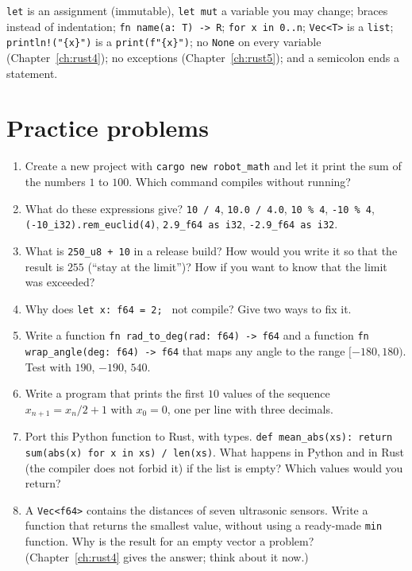 \begin{aibox}
\verb!let! is an assignment (immutable), \verb!let mut! a variable you may change; braces instead of indentation; \verb!fn name(a: T) -> R!; \verb!for x in 0..n!; \verb!Vec<T>! is a \verb!list!; \verb|println!("{x}")| is a \verb!print(f"{x}")!; no \verb!None! on every variable (Chapter~\ref{ch:rust4}); no exceptions (Chapter~\ref{ch:rust5}); and a semicolon ends a statement.
\end{aibox}

\section*{Practice problems}
\begin{enumerate}[label=\textbf{\thechapter.\arabic*}]
  \item Create a new project with \verb!cargo new robot_math! and let it print the sum of the numbers $1$ to $100$. Which command compiles without running?
  \item What do these expressions give? \verb!10 / 4!, \verb!10.0 / 4.0!, \verb!10 % 4!, \verb!-10 % 4!, \verb!(-10_i32).rem_euclid(4)!, \verb!2.9_f64 as i32!, \verb!-2.9_f64 as i32!.
  \item What is \verb!250_u8 + 10! in a release build? How would you write it so that the result is $255$ (``stay at the limit'')? How if you want to know that the limit was exceeded?
  \item Why does \verb!let x: f64 = 2; ! not compile? Give two ways to fix it.
  \item Write a function \verb!fn rad_to_deg(rad: f64) -> f64! and a function \verb!fn wrap_angle(deg: f64) -> f64! that maps any angle to the range $[-180,180)$. Test with $190$, $-190$, $540$.
  \item Write a program that prints the first $10$ values of the sequence $x_{n+1}=x_n/2+1$ with $x_0=0$, one per line with three decimals.
  \item Port this Python function to Rust, with types. \verb!def mean_abs(xs): return sum(abs(x) for x in xs) / len(xs)!. What happens in Python and in Rust (the compiler does not forbid it) if the list is empty? Which values would you return?
  \item A \verb!Vec<f64>! contains the distances of seven ultrasonic sensors. Write a function that returns the smallest value, without using a ready-made \verb!min! function. Why is the result for an empty vector a problem? (Chapter~\ref{ch:rust4} gives the answer; think about it now.)

\end{enumerate}
